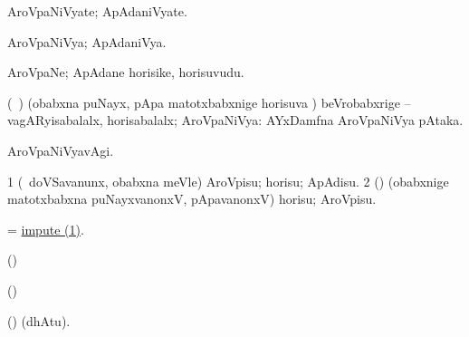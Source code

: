 \bentry
{}
\gl{\nA}
\bmng
AroVpaNiVyate; ApAdaniVyate. 
\emng
\eentry

\bentry
{}
\gl{\gu}
\bmng
AroVpaNiVya; ApAdaniVya. 
\emng
\eentry

\bentry
{}
\gl{\nA}
\bmng
AroVpaNe; ApAdane horisike, horisuvudu. 
\emng
\eentry

\bentry
{}
\gl{\gu}
\bmng
(\kanmu\ \deVva) (obabxna puNayx, pApa matotxbabxnige horisuva \vi) beVrobabxrige -- vagARyisabalalx, horisabalalx; AroVpaNiVya:  AYxDamfna AroVpaNiVya pAtaka. 
\emng
\eentry

\bentry
{}
\gl{\kirxvi}
\bmng
AroVpaNiVyavAgi. 
\emng
\eentry

\bentry
{}
\gl{\sakirx}
\bmng
\bnum
\num{1} (\kanmu\ doVSavanunx, obabxna meVle) AroVpisu; horisu; ApAdisu. 
\num{2} (\deVva) (obabxnige matotxbabxna puNayxvanonxV, pApavanonxV) horisu; AroVpisu. 
\enum
\emng

\noindent
\gl{\pagu}
\bmng
{} = \hyperlink{impute}{impute (1)}. 
\emng
\eentry

\bentry
{}
\gl{\saMkiSx}
\bmng
{} 
\emng
\eentry

\bentry
{}
\gl{\saMkiSx}
\bmng
(\birx)  
\emng
\eentry

\bentry
{}
\gl{\saMkiSx}
\bmng
(\ame)  
\emng
\eentry

\bentry
{}
\gl{\saMkeV}
\bmng
(\ravi)  (dhAtu). 
\emng
\eentry

